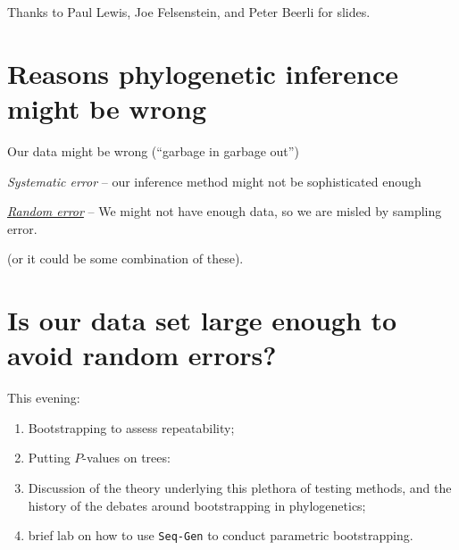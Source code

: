\documentclass[landscape]{foils}
\begin{document}
\myNewSlide
\huge 
Thanks to Paul Lewis, Joe Felsenstein, and Peter Beerli for slides.

\myNewSlide
\section*{Reasons phylogenetic inference might be wrong}
\Large
\begin{compactenum}
	\item Our data might be wrong (``garbage in garbage out'')
	\item {\em Systematic error} -- our inference method might not be sophisticated enough
	\item \underline{{\em Random error}} -- We might not have enough data, so we are misled by sampling error.
\end{compactenum}

(or it could be some combination of these).

\myNewSlide
\section*{Is our data set large enough to avoid random errors?}

This evening:
\begin{enumerate}
	\item Bootstrapping to assess repeatability;
	\item Putting $P$-values on trees:
	\item Discussion of the theory underlying this plethora of testing methods, and the history of the debates around bootstrapping in phylogenetics;
	\item brief lab on how to use {\tt Seq-Gen} to conduct parametric bootstrapping.
\end{enumerate}


\myNewSlide
 

\myNewSlide
 
\end{document}
